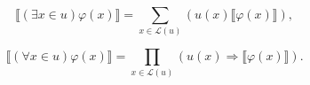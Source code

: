 $$\llbracket (\exists x \in u) \varphi(x) \rrbracket = \sum_{x \in \mathcal{L}(u)} (u(x) \llbracket \varphi(x) \rrbracket),$$

$$\llbracket (\forall x \in u) \varphi(x) \rrbracket = \prod_{x \in \mathcal{L}(u)} (u(x) \Rightarrow \llbracket \varphi(x) \rrbracket).$$
